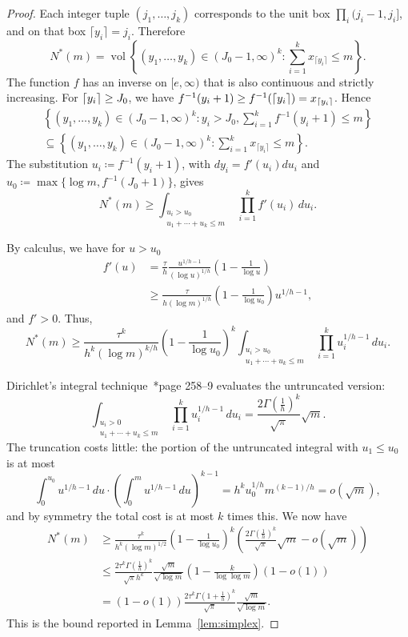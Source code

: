 \documentclass[10pt,letterpaper]{article}
\DeclarePairedDelimiter{\ceiling}{\lceil}{\rceil}
\theoremstyle{remark}
\begin{document}
\begin{proof}
Each integer tuple $(j_1,\dots,j_k)$ corresponds to the unit box $\prod_{i}(j_i-1,j_i]$, and on that box $\lceil y_i\rceil=j_i$. 
Therefore
  \[N^{*}(m) = \operatorname{vol}\left\{(y_1,\dots,y_k) \in (J_0-1,\infty)^k :
     \sum_{i=1}^k x_{\lceil y_i\rceil}\le m\right\}.\]
The function $f$ has an inverse on $[e,\infty)$ that is also continuous and strictly increasing. 
For $\ceiling{y_i}\ge J_0$, we have $f^{-1}(y_i+1)\ge f^{-1}(\ceiling{y_i}) = x_{\ceiling{y_i}}$.
Hence
  \begin{multline*}
    \left\{ (y_1,\dots,y_k) \in (J_0-1,\infty)^k : y_i > J_0,
     \sum_{i=1}^k f^{-1}(y_i+1) \le m\right\}\\
     \subseteq
     \left\{(y_1,\dots,y_k) \in (J_0-1,\infty)^k :
     \sum_{i=1}^k x_{\lceil y_i\rceil}\le m\right\}.
  \end{multline*}
The substitution $u_i\coloneqq f^{-1}(y_i+1)$, with $dy_i=f'(u_i)du_i$ and
$u_0\coloneqq \max\{\log m, f^{-1}(J_0+1)\}$, gives
  \[N^{*}(m) \ge \int_{\substack{u_i>u_0\\ u_1+\cdots+u_k\le m}}
     \prod_{i=1}^k f'(u_i)\,du_i.\]
 

By calculus, we have for $u>u_0$
  \begin{align*}
    f'(u) 
    &= \frac{\tau}{h} \frac{u^{1/h-1}}{(\log u)^{1/h}} \left( 1-\frac{1}{\log u} \right) \\
    &\ge \frac{\tau}{h(\log m)^{1/h}} \left( 1-\frac{1}{\log u_0} \right) u^{1/h-1},
  \end{align*}
and $f'>0$.
Thus,
  \[N^{*}(m) \ge \frac{\tau^k}{h^k(\log m)^{k/h}} \left( 1-\frac{1}{\log u_0} \right)^k
  \int_{\substack{u_i>u_0\\ u_1+\cdots+u_k\le m}}
     \prod_{i=1}^k u_i^{1/h-1} \,du_i.\]

Dirichlet's integral technique~\cite{1927.Whittaker&Watson}*{page 258--9} evaluates the untruncated version:
  \[\int_{\substack{u_i>0\\ u_1+\cdots+u_k\le m}}
     \prod_{i=1}^k u_i^{1/h-1}\,du_i
     = \frac{2\Gamma(\tfrac1h)^k}{\sqrt{\pi}}\sqrt m.\]
The truncation costs little: the portion of the untruncated integral with $u_1\le u_0$ is at most
  \[\int_0^{u_0}u^{1/h-1}\,du\cdot
    \left(\int_0^m u^{1/h-1}\,du\right)^{k-1}
    = h^k u_0^{1/h} m^{(k-1)/h} = o(\sqrt{m}),\]
and by symmetry the total cost is at most $k$ times this. 
We now have
  \begin{align*}
    N^{*}(m) 
    &\ge \frac{\tau^k}{h^k(\log m)^{1/2}} \left( 1-\frac{1}{\log u_0} \right)^k
  \left(\frac{2\Gamma(\tfrac1h)^k}{\sqrt{\pi}}\sqrt m - o(\sqrt m)\right)\\
    &\le \frac{2\tau^k \Gamma(\tfrac1h)^k}{\sqrt{\pi} h^k} \frac{\sqrt{m}}{\sqrt{\log m}} \left( 1-\frac{k}{\log \log m} \right)
  \left(1 - o(1)\right)\\
  &= (1-o(1)) \frac{2\tau^k \Gamma(1+\tfrac1h)^k}{\sqrt{\pi}} \frac{\sqrt{m}}{\sqrt{\log m}}.
  \end{align*}
This is the bound reported in Lemma~\ref{lem:simplex}.
\end{proof}
\end{document}

